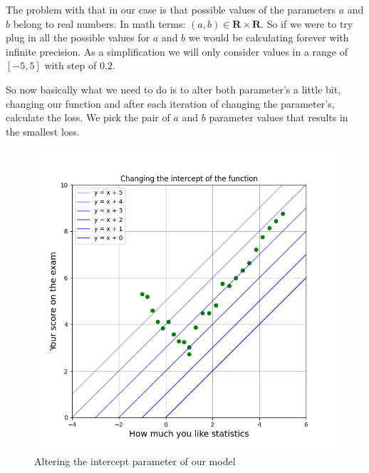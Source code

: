 \documentclass{article}
\begin{document}
The problem with that in our case is that possible values of the parameters $a$ and $b$ belong to real numbers. In math terms: $(a, b) \in \mathbf{R}\times\mathbf{R}$. So if we were to try plug in all the possible values for $a$ and $b$ we would be calculating forever with infinite precision. As a simplification we will only consider values in a range of $[-5,5]$ with step of $0.2$.

So now basically what we need to do is to alter both parameter's a little bit, changing our function and after each iteration of changing the parameter's, calculate the loss. We pick the pair of $a$ and $b$ parameter values that results in the smallest loss.

\begin{figure}[h]
    \centering
    \begin{minipage}{0.4\textwidth}
        \centering
        \includegraphics[width=\linewidth]{../images/myplot3.png}
        \caption{Altering the intercept parameter of our model}
    \end{minipage}
    \hfill
    \begin{minipage}{0.4\textwidth}
        \centering

\end{minipage}
\end{figure}
\end{document}
